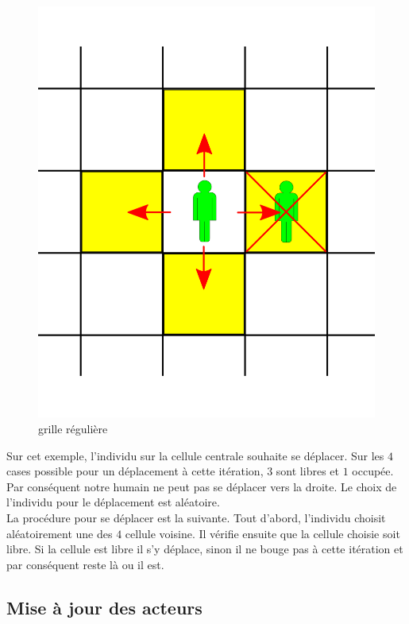 \begin{figure}[h]
\centering
\captionsetup{justification=centering}
\includegraphics[scale=0.5]{Images/move_available.png}
\caption{grille régulière}
\end{figure}

Sur cet exemple, l'individu sur la cellule centrale souhaite se déplacer. Sur les $4$ cases possible pour un déplacement à cette itération, $3$ sont libres et $1$ occupée. Par conséquent notre humain ne peut pas se déplacer vers la droite. Le choix de l'individu pour le déplacement est aléatoire.\\

La procédure pour se déplacer est la suivante. Tout d'abord, l'individu choisit aléatoirement une des $4$ cellule voisine. Il vérifie ensuite que la cellule choisie soit libre. Si la cellule est libre il s'y déplace, sinon il ne bouge pas à cette itération et par conséquent reste là ou il est.

\subsection{Mise à jour des acteurs}

